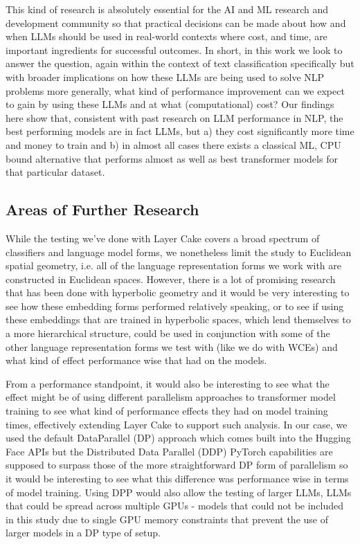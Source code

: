 \documentclass[final]{clv2025-revised}
\begin{document}
This kind of research is absolutely essential for the AI and ML research and development community so that practical decisions can be made about how and when LLMs should be used in real-world contexts where cost, and time, are important ingredients for successful outcomes. In short, in this work we look to answer the question, again within the context of text classification specifically but with broader implications on how these LLMs are being used to solve NLP problems more generally, what kind of performance improvement can we expect to gain by using these LLMs and at what (computational) cost? Our findings here show that, consistent with past research on LLM performance in NLP, the best performing models are in fact LLMs, but a) they cost significantly more time and money to train and b) in almost all cases there exists a classical ML, CPU bound alternative that performs almost as well as best transformer models for that particular dataset. 


\subsection{Areas of Further Research }

While the testing we've done with Layer Cake covers a broad spectrum of classifiers and language model forms, we nonetheless limit the study to Euclidean spatial geometry, i.e. all of the language representation forms we work with are constructed in Euclidean spaces. However, there is a lot of promising research that has been done with hyperbolic geometry \cite{tifrea} \cite{leimeister2019skip} \cite{valentino} and it would be very interesting to see how these embedding forms performed relatively speaking, or to see if using these embeddings that are trained in hyperbolic spaces, which lend themselves to a more hierarchical structure, could be used in conjunction with some of the other language representation forms we test with (like we do with WCEs) and what kind of effect performance wise that had on the models.

From a performance standpoint, it would also be interesting to see what the effect might be of using different parallelism approaches to transformer model training to see what kind of performance effects they had on model training times, effectively extending Layer Cake to support such analysis. In our case, we used the default DataParallel (DP) approach which comes built into the Hugging Face APIs but the Distributed Data Parallel (DDP) PyTorch capabilities are supposed to surpass those of the more straightforward DP form of parallelism so it would be interesting to see what this difference was performance wise in terms of model training. Using DPP would also allow the testing of larger LLMs, LLMs that could be spread across multiple GPUs - models that could not be included in this study due to single GPU memory constraints that prevent the use of larger models in a DP type of setup. 
\end{document}

